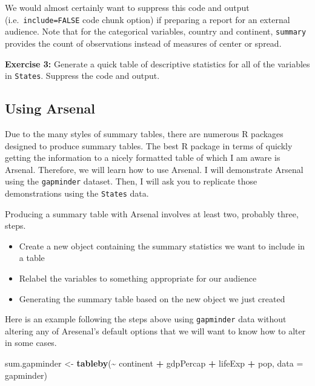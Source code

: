 \documentclass[
]{book}
\makeatletter
\newenvironment{Shaded}{\begin{snugshade}}{\end{snugshade}}
\newcommand{\AttributeTok}[1]{\textcolor[rgb]{0.27,0.27,0.27}{#1}}
\newcommand{\FunctionTok}[1]{\textcolor[rgb]{0.27,0.27,0.27}{\textbf{#1}}}
\newcommand{\NormalTok}[1]{#1}
\newcommand{\OtherTok}[1]{\textcolor[rgb]{0.37,0.37,0.37}{#1}}
\newcommand{\SpecialCharTok}[1]{\textcolor[rgb]{0.43,0.43,0.43}{\textbf{#1}}}
\providecommand{\tightlist}{%
  \setlength{\itemsep}{0pt}\setlength{\parskip}{0pt}}
\newenvironment{kframe}{%
\medskip{}
\setlength{\fboxsep}{.8em}
 \def\at@end@of@kframe{}%
 \ifinner\ifhmode%
  \def\at@end@of@kframe{\end{minipage}}%
  \begin{minipage}{\columnwidth}%
 \fi\fi%
 \def\FrameCommand##1{\hskip\@totalleftmargin \hskip-\fboxsep
 \colorbox{shadecolor}{##1}\hskip-\fboxsep
     \hskip-\linewidth \hskip-\@totalleftmargin \hskip\columnwidth}%
 \MakeFramed {\advance\hsize-\width
   \@totalleftmargin\z@ \linewidth\hsize
   \@setminipage}}%
 {\par\unskip\endMakeFramed%
 \at@end@of@kframe}
\renewenvironment{Shaded}{\begin{kframe}}{\end{kframe}}
\newenvironment{rmdblock}[1]
  {\begin{shaded*}
  }
  {\end{shaded*}
  }
\newenvironment{learncheck}
  {\begin{rmdblock}{warning}}
  {\end{rmdblock}}
\makeatother
\begin{document}
We would almost certainly want to suppress this code and output (i.e.~\texttt{include=FALSE} code chunk option) if preparing a report for an external audience. Note that for the categorical variables, country and continent, \texttt{summary} provides the count of observations instead of measures of center or spread.

\begin{learncheck}
\textbf{Exercise 3:} Generate a quick table of descriptive statistics
for all of the variables in \texttt{States}. Suppress the code and
output.
\end{learncheck}

\hypertarget{using-arsenal}{%
\subsection{Using Arsenal}\label{using-arsenal}}

Due to the many styles of summary tables, there are numerous R packages designed to produce summary tables. The best R package in terms of quickly getting the information to a nicely formatted table of which I am aware is Arsenal. Therefore, we will learn how to use Arsenal. I will demonstrate Arsenal using the \texttt{gapminder} dataset. Then, I will ask you to replicate those demonstrations using the \texttt{States} data.

Producing a summary table with Arsenal involves at least two, probably three, steps.

\begin{itemize}
\tightlist
\item
  Create a new object containing the summary statistics we want to include in a table
\item
  Relabel the variables to something appropriate for our audience
\item
  Generating the summary table based on the new object we just created
\end{itemize}

Here is an example following the steps above using \texttt{gapminder} data without altering any of Aresenal's default options that we will want to know how to alter in some cases.

\begin{Shaded}
\begin{Highlighting}[]
\NormalTok{sum.gapminder }\OtherTok{\textless{}{-}} \FunctionTok{tableby}\NormalTok{(}\SpecialCharTok{\textasciitilde{}}\NormalTok{ continent }\SpecialCharTok{+}\NormalTok{ gdpPercap }\SpecialCharTok{+}\NormalTok{ lifeExp }\SpecialCharTok{+}\NormalTok{ pop, }\AttributeTok{data =}\NormalTok{ gapminder)}
\end{Highlighting}
\end{Shaded}
\end{document}
